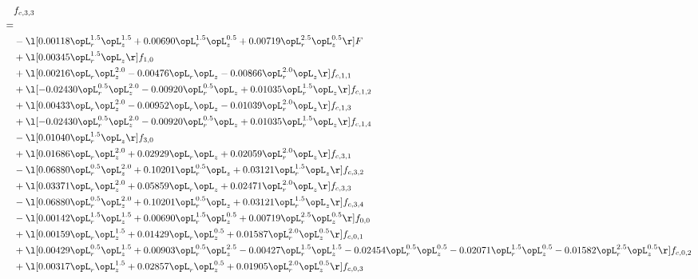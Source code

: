 \begin{alignat}{2} 
\label{eq:f_33_1} 
& f_{c,3,3} \nonumber \\ 
 = \\ 
& - \l[  0.00118 \opL_r^{1.5} \opL_z^{1.5} +  0.00690 \opL_r^{1.5} \opL_z^{0.5} +  0.00719 \opL_r^{2.5} \opL_z^{0.5}  \r] F \nonumber \\ 
& + \l[  0.00345 \opL_r^{1.5} \opL_z  \r] f_{1,0} \nonumber \\ 
& + \l[  0.00216 \opL_r \opL_z^{2.0}   -0.00476 \opL_r \opL_z   -0.00866 \opL_r^{2.0} \opL_z  \r] f_{c,1,1} \nonumber \\ 
& + \l[  -0.02430 \opL_r^{0.5} \opL_z^{2.0}   -0.00920 \opL_r^{0.5} \opL_z +  0.01035 \opL_r^{1.5} \opL_z  \r] f_{c,1,2} \nonumber \\ 
& + \l[  0.00433 \opL_r \opL_z^{2.0}   -0.00952 \opL_r \opL_z   -0.01039 \opL_r^{2.0} \opL_z  \r] f_{c,1,3} \nonumber \\ 
& + \l[  -0.02430 \opL_r^{0.5} \opL_z^{2.0}   -0.00920 \opL_r^{0.5} \opL_z +  0.01035 \opL_r^{1.5} \opL_z  \r] f_{c,1,4} \nonumber \\ 
& - \l[  0.01040 \opL_r^{1.5} \opL_z  \r] f_{3,0} \nonumber \\ 
& + \l[  0.01686 \opL_r \opL_z^{2.0} +  0.02929 \opL_r \opL_z +  0.02059 \opL_r^{2.0} \opL_z  \r] f_{c,3,1} \nonumber \\ 
& - \l[  0.06880 \opL_r^{0.5} \opL_z^{2.0} +  0.10201 \opL_r^{0.5} \opL_z +  0.03121 \opL_r^{1.5} \opL_z  \r] f_{c,3,2} \nonumber \\ 
& + \l[  0.03371 \opL_r \opL_z^{2.0} +  0.05859 \opL_r \opL_z +  0.02471 \opL_r^{2.0} \opL_z  \r] f_{c,3,3} \nonumber \\ 
& - \l[  0.06880 \opL_r^{0.5} \opL_z^{2.0} +  0.10201 \opL_r^{0.5} \opL_z +  0.03121 \opL_r^{1.5} \opL_z  \r] f_{c,3,4} \nonumber \\ 
& - \l[  0.00142 \opL_r^{1.5} \opL_z^{1.5} +  0.00690 \opL_r^{1.5} \opL_z^{0.5} +  0.00719 \opL_r^{2.5} \opL_z^{0.5}  \r] f_{0,0} \nonumber \\ 
& + \l[  0.00159 \opL_r \opL_z^{1.5} +  0.01429 \opL_r \opL_z^{0.5} +  0.01587 \opL_r^{2.0} \opL_z^{0.5}  \r] f_{c,0,1} \nonumber \\ 
& + \l[  0.00429 \opL_r^{0.5} \opL_z^{1.5} +  0.00903 \opL_r^{0.5} \opL_z^{2.5}   -0.00427 \opL_r^{1.5} \opL_z^{1.5}   -0.02454 \opL_r^{0.5} \opL_z^{0.5}   -0.02071 \opL_r^{1.5} \opL_z^{0.5}   -0.01582 \opL_r^{2.5} \opL_z^{0.5}  \r] f_{c,0,2} \nonumber \\ 
& + \l[  0.00317 \opL_r \opL_z^{1.5} +  0.02857 \opL_r \opL_z^{0.5} +  0.01905 \opL_r^{2.0} \opL_z^{0.5}  \r] f_{c,0,3} \nonumber \\ 

\end{alignat}
